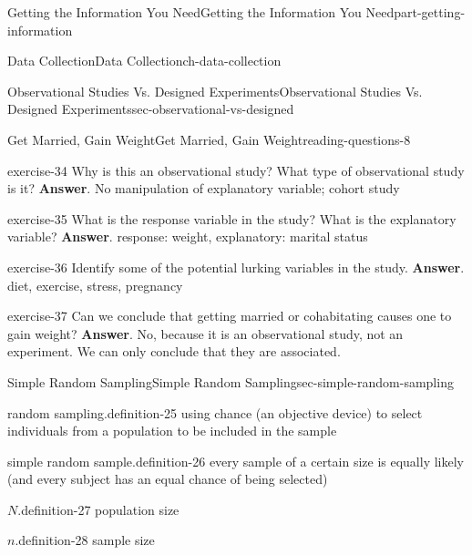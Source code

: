 \documentclass[oneside,10pt,]{book}
\numberwithin{equation}{section}
\begin{document}
\begin{partptx}{Getting the Information You Need}{}{Getting the Information You Need}{}{}{part-getting-information}
\begin{chapterptx}{Data Collection}{}{Data Collection}{}{}{ch-data-collection}
\begin{sectionptx}{Observational Studies Vs. Designed Experiments}{}{Observational Studies Vs. Designed Experiments}{}{}{sec-observational-vs-designed}
\begin{reading-questions-subsection-numberless}{Get Married, Gain Weight}{}{Get Married, Gain Weight}{}{}{reading-questions-8}
\begin{divisionexercise}{1}{}{}{exercise-34}%
Why is this an observational study? What type of observational study is it? \textbf{Answer}.\hypertarget{answer-34}{}\quad%
No manipulation of explanatory variable; cohort study\end{divisionexercise}%
\begin{divisionexercise}{2}{}{}{exercise-35}%
What is the response variable in the study? What is the explanatory variable? \textbf{Answer}.\hypertarget{answer-35}{}\quad%
response: weight, explanatory: marital status\end{divisionexercise}%
\begin{divisionexercise}{3}{}{}{exercise-36}%
Identify some of the potential lurking variables in the study. \textbf{Answer}.\hypertarget{answer-36}{}\quad%
diet, exercise, stress, pregnancy\end{divisionexercise}%
\begin{divisionexercise}{4}{}{}{exercise-37}%
Can we conclude that getting married or cohabitating causes one to gain weight? \textbf{Answer}.\hypertarget{answer-37}{}\quad%
No, because it is an observational study, not an experiment. We can only conclude that they are associated.\end{divisionexercise}%
\end{reading-questions-subsection-numberless}
\end{sectionptx}
%
%
\typeout{************************************************}
\typeout{************************************************}
%
\begin{sectionptx}{Simple Random Sampling}{}{Simple Random Sampling}{}{}{sec-simple-random-sampling}
\begin{definition}{random sampling.}{definition-25}%
using chance (an objective device) to select individuals from a population to be included in the sample\end{definition}
\begin{definition}{simple random sample.}{definition-26}%
every sample of a certain size is equally likely (and every subject has an equal chance of being selected)\end{definition}
\begin{definition}{\(N\).}{definition-27}%
population size\end{definition}
\begin{definition}{\(n\).}{definition-28}%
sample size\end{definition}

\end{sectionptx}
\end{chapterptx}
\end{partptx}
\end{document}
